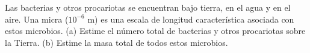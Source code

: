 \item Las bacterias y otros procariotas se encuentran bajo tierra, en el agua y en el aire. Una micra ($10^{-6} \text{ m}$) es una escala de longitud característica asociada con estos microbios. (a) Estime el número total de bacterias y otros procariotas sobre la Tierra. (b) Estime la masa total de todos estos microbios.
